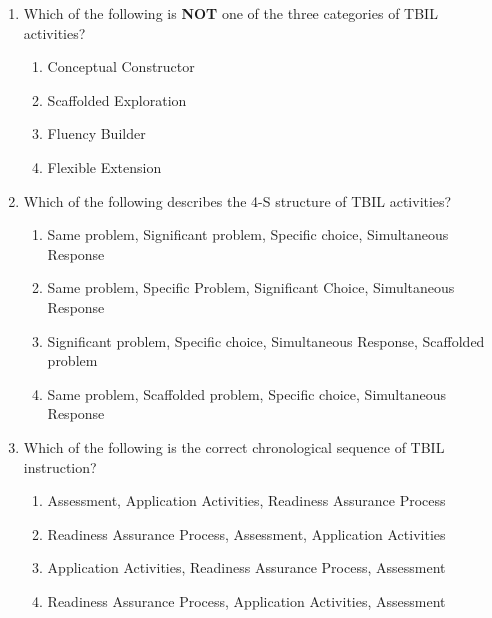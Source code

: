 \documentclass{article}
\begin{document}
\begin{enumerate}[itemsep=0.5in]


    \item Which of the following is \textbf{NOT} one of the three categories of TBIL activities?

                  \begin{enumerate}[label=\Alph*)]
                      \item Conceptual Constructor %
                      \item Scaffolded Exploration
                      \item Fluency Builder
                      \item Flexible Extension

                  \end{enumerate}



   \item Which of the following describes the 4-S structure of TBIL activities?

                  \begin{enumerate}[label=\Alph*)]
                      \item Same problem, Significant problem, Specific choice, Simultaneous Response %
                      \item Same problem, Specific Problem, Significant Choice, Simultaneous Response
                      \item Significant problem, Specific choice, Simultaneous Response, Scaffolded problem
                      \item Same problem, Scaffolded problem, Specific choice, Simultaneous Response 
                  \end{enumerate}

    \item Which of the following is the correct chronological sequence of TBIL instruction?

            \begin{enumerate}[label=\Alph*)]
                  
                  \item Assessment, Application Activities, Readiness Assurance Process
                  \item Readiness Assurance Process, Assessment, Application Activities
                  \item Application Activities, Readiness Assurance Process, Assessment
                  \item Readiness Assurance Process, Application Activities, Assessment %
              \end{enumerate}


\end{enumerate}
\end{document}
